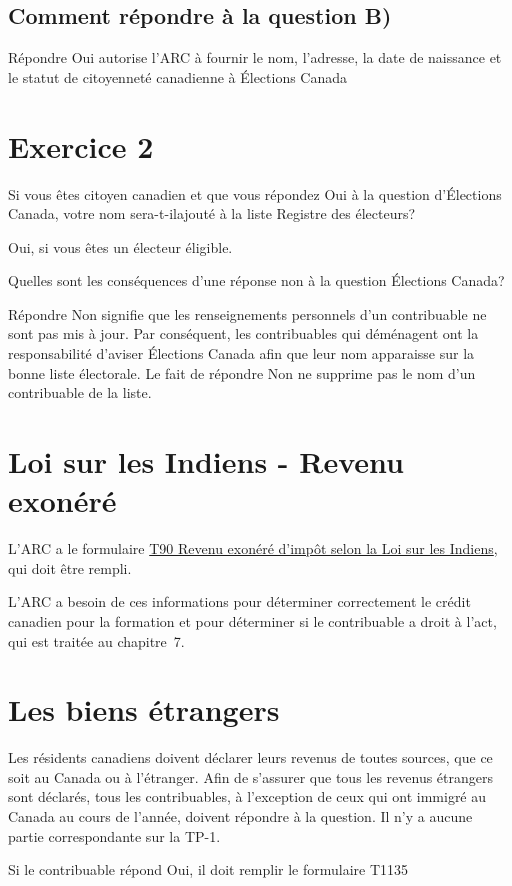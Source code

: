 \subsection{Comment répondre à la question B)}
Répondre \og Oui\fg{} autorise l'ARC à fournir le nom, l'adresse, la date de naissance et le statut de citoyenneté canadienne à Élections Canada



\section{Exercice 2}
\setcounter{question}{0}
\begin{question}
	Si vous êtes citoyen canadien et que vous répondez \og Oui\fg{} à la question d'Élections Canada, votre nom sera-t-ilajouté à la liste Registre des électeurs?
\end{question}
Oui, si vous êtes un électeur éligible.

\begin{question}
	Quelles sont les conséquences d'une réponse \og non\fg{} à la question Élections Canada?
\end{question}
Répondre \og Non\fg{} signifie que les renseignements personnels d'un contribuable ne sont pas mis à jour. Par conséquent, les contribuables qui déménagent ont la responsabilité d'aviser Élections Canada afin que leur nom apparaisse sur la bonne liste électorale. Le fait de répondre \og Non\fg{} ne supprime pas le nom d'un contribuable de la liste.



\section{Loi sur les Indiens - Revenu exonéré}
\begin{intro}
	L'ARC a le formulaire \href{https://www.canada.ca/fr/agence-revenu/services/formulaires-publications/formulaires/t90.html}{T90 Revenu exonéré d'impôt selon la Loi sur les Indiens}, qui doit être rempli.
\end{intro}

\begin{note}
	L'ARC a besoin de ces informations pour déterminer correctement le crédit canadien pour la formation et pour déterminer si le contribuable a droit à l'\acrfull{act}, qui est traitée au chapitre~7.
\end{note}



\section{Les biens étrangers}
\ca
\begin{intro}
	Les résidents canadiens doivent déclarer leurs revenus de toutes sources, que ce soit au Canada ou à l'étranger. Afin de s'assurer que tous les revenus étrangers sont déclarés, tous les contribuables, à l'exception de ceux qui ont immigré au Canada au cours de l'année, doivent répondre à la question. Il n'y a aucune partie correspondante sur la TP-1.
\end{intro}
Si le contribuable répond \og Oui\fg{}, il doit remplir le formulaire T1135


